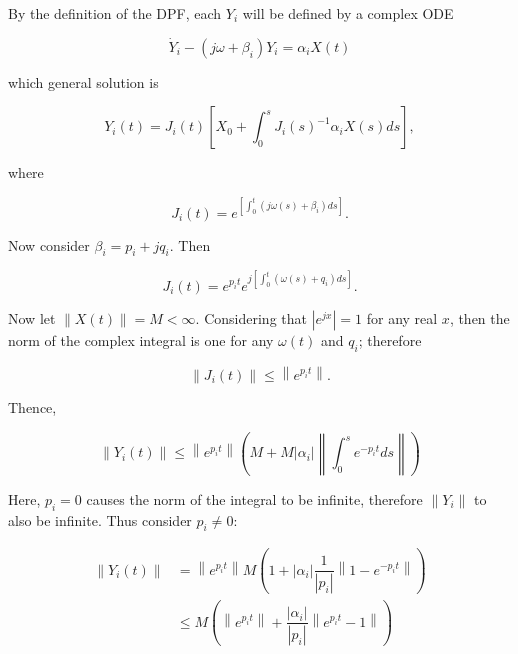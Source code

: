 	By the definition of the DPF, each $Y_i$ will be defined by a complex ODE

\begin{equation} \dot{Y}_i - \left(j\omega + \beta_i\right)Y_i = \alpha_i X(t)\end{equation}

	\noindent which general solution is

\begin{equation} Y_i(t) = J_i(t) \left[X_0 + \int_0^s J_i(s)^{-1} \alpha_i X(s)ds \right], \end{equation}

	\noindent where

\begin{equation} J_i(t) = e^{\left[\displaystyle\int_0^t \left(j\omega(s) + \beta_i\right)ds\right]} . \end{equation}

	Now consider $\beta_i = p_i + jq_i$. Then

\begin{equation} J_i(t) = e^{p_i t} e^{j\left[\displaystyle\int_0^t \left(\omega(s) + q_i\right)ds\right]} . \end{equation}

	Now let $\left\lVert X(t)\right\rVert = M < \infty$. Considering that $\left\lvert e^{jx}\right\rvert = 1$ for any real $x$, then the norm of the complex integral is one for any $\omega(t)$ and $q_i$; therefore

\begin{equation} \left\lVert J_i(t) \right\rVert \leq \left\lVert e^{p_i t} \right\rVert . \end{equation}

	Thence,

\begin{equation} \left\lVert Y_i(t) \right\lVert \leq \left\lVert e^{p_it} \right\rVert \left( M + M\left\lvert \alpha_i \right\rvert \left\lVert \int_0^s e^{-p_it}ds\right\rVert \right) \end{equation}

	Here, $p_i = 0$ causes the norm of the integral to be infinite, therefore $\left\lVert Y_i\right\rVert$ to also be infinite. Thus consider $p_i\neq 0$:

\begin{align} \left\lVert Y_i(t) \right\lVert 
	&= \left\lVert e^{p_it} \right\rVert M\left(1 + \left\lvert \alpha_i \right\rvert \dfrac{1}{\left\lvert p_i\right\rvert} \left\lVert 1 - e^{-p_it} \right\rVert \right) \nonumber\\[3mm]
	&\leq M \left(\left\lVert e^{p_it} \right\rVert + \dfrac{\left\lvert \alpha_i \right\rvert}{\left\lvert p_i\right\rvert} \left\lVert e^{p_it} -1 \right\rVert \right)
\end{align}


